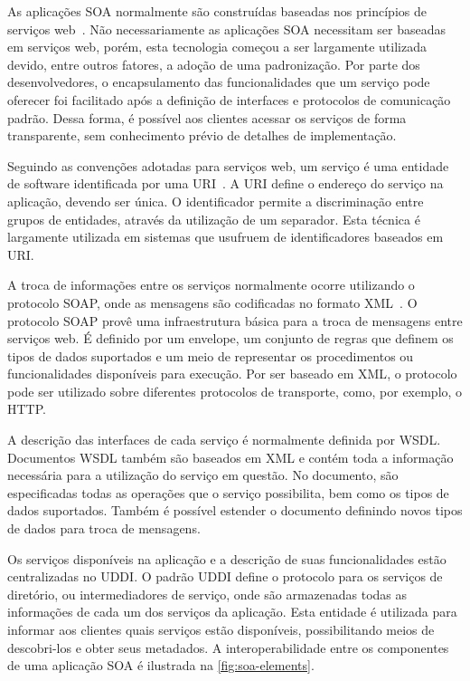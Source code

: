 As aplicações \gls{SOA} normalmente são construídas baseadas nos princípios de serviços
web~\cite{josuttis2009soa}. Não necessariamente as aplicações \gls{SOA} necessitam ser baseadas em
serviços web, porém, esta tecnologia começou a ser largamente utilizada devido, entre outros
fatores, a adoção de uma padronização. Por parte dos desenvolvedores, o encapsulamento das
funcionalidades que um serviço pode oferecer foi facilitado após a definição de interfaces e
protocolos de comunicação padrão. Dessa forma, é possível aos clientes acessar os serviços de forma
transparente, sem conhecimento prévio de detalhes de implementação.

Seguindo as convenções adotadas para serviços web, um serviço é uma entidade de software
identificada por uma \gls{URI}~\cite{bell2008service}. A \gls{URI} define o endereço do serviço na
aplicação, devendo ser única. O identificador permite a discriminação entre grupos de entidades,
através da utilização de um separador. Esta técnica é largamente utilizada em sistemas que usufruem
de identificadores baseados em \gls{URI}.

A troca de informações entre os serviços normalmente ocorre utilizando o protocolo \gls{SOAP}, onde
as mensagens são codificadas no formato \gls{XML}~\cite{josuttis2009soa}. O protocolo \gls{SOAP}
provê uma infraestrutura básica para a troca de mensagens entre serviços web. É definido por um
envelope, um conjunto de regras que definem os tipos de dados suportados e um meio de representar os
procedimentos ou funcionalidades disponíveis para execução. Por ser baseado em \gls{XML}, o
protocolo pode ser utilizado sobre diferentes protocolos de transporte, como, por exemplo, o
\gls{HTTP}.

A descrição das interfaces de cada serviço é normalmente definida por \gls{WSDL}. Documentos
\gls{WSDL} também são baseados em \gls{XML} e contém toda a informação necessária para a utilização
do serviço em questão. No documento, são especificadas todas as operações que o serviço possibilita,
bem como os tipos de dados suportados. Também é possível estender o documento definindo novos tipos
de dados para troca de mensagens.

Os serviços disponíveis na aplicação e a descrição de suas funcionalidades estão centralizadas no
\gls{UDDI}. O padrão \gls{UDDI} define o protocolo para os serviços de diretório, ou intermediadores
de serviço, onde são armazenadas todas as informações de cada um dos serviços da aplicação. Esta
entidade é utilizada para informar aos clientes quais serviços estão disponíveis, possibilitando
meios de descobri-los e obter seus metadados. A interoperabilidade entre os componentes de uma
aplicação \gls{SOA} é ilustrada na \cref{fig:soa-elements}.

